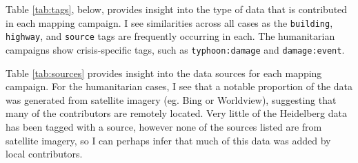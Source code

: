 Table \ref{tab:tags}, below, provides insight into the type of data that is contributed in each mapping campaign. I see similarities across all cases as the \texttt{building}, \texttt{highway}, and \texttt{source} tags are frequently occurring in each. The humanitarian campaigns show crisis-specific tags, such as \texttt{typhoon:damage} and \texttt{damage:event}.  

Table \ref{tab:sources} provides insight into the data sources for each mapping campaign. For the humanitarian cases, I see that a notable proportion of the data was generated from satellite imagery (eg. Bing or Worldview), suggesting that many of the contributors are remotely located. Very little of the Heidelberg data has been tagged with a source, however none of the sources listed are from satellite imagery, so I can perhaps infer that much of this data was added by local contributors. 

